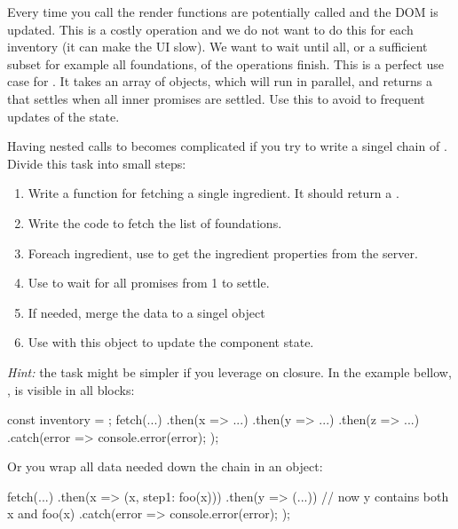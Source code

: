 \documentclass[fleqn, article, a4paper]{memoir}
\begin{document}
\begin{Assignments}
Every time you call  the render functions are potentially called and the DOM is updated. This is a costly operation and we do not want to do this for each inventory (it can make the UI slow). We want to wait until all, or a sufficient subset for example all foundations, of the  operations finish. This is a perfect use case for . It takes an array of  objects, which will run in parallel, and returns a  that settles when all inner promises are settled. Use this to avoid to frequent updates of the state.

Having nested calls to  becomes complicated if you try to write a singel chain of . Divide this task into small steps:
\begin{enumerate}
\item Write a function for fetching a single ingredient. It should return a .
\item Write the code to fetch the list of foundations.
\item Foreach ingredient, use  to get the ingredient properties from the server.
\item Use  to wait for all promises from 1 to settle.
\item If needed, merge the data to a singel object
\item Use  with this object to update the component state.
\end{enumerate}
\emph{Hint:} the task might be simpler if you leverage on closure. In the example bellow, , is visible in all  blocks:
\begin{Code}
const inventory = {};
fetch(...)
.then(x => {...})
.then(y => {...})
.then(z => {...})
.catch(error => {
  console.error(error);
});
\end{Code}
\noindent Or you wrap all data needed down the chain in an object:
\begin{Code}
fetch(...)
.then(x => ({x, step1: foo(x)}))
.then(y => (...))  // now y contains both x and foo(x)
.catch(error => {
  console.error(error);
});
\end{Code}

\end{Assignments}
\end{document}
